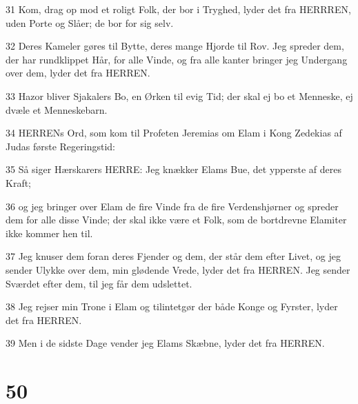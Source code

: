 \par 31 Kom, drag op mod et roligt Folk, der bor i Tryghed, lyder det fra HERRREN, uden Porte og Slåer; de bor for sig selv.
\par 32 Deres Kameler gøres til Bytte, deres mange Hjorde til Rov. Jeg spreder dem, der har rundklippet Hår, for alle Vinde, og fra alle kanter bringer jeg Undergang over dem, lyder det fra HERREN.
\par 33 Hazor bliver Sjakalers Bo, en Ørken til evig Tid; der skal ej bo et Menneske, ej dvæle et Menneskebarn.
\par 34 HERRENs Ord, som kom til Profeten Jeremias om Elam i Kong Zedekias af Judas første Regeringstid:
\par 35 Så siger Hærskarers HERRE: Jeg knækker Elams Bue, det ypperste af deres Kraft;
\par 36 og jeg bringer over Elam de fire Vinde fra de fire Verdenshjørner og spreder dem for alle disse Vinde; der skal ikke være et Folk, som de bortdrevne Elamiter ikke kommer hen til.
\par 37 Jeg knuser dem foran deres Fjender og dem, der står dem efter Livet, og jeg sender Ulykke over dem, min glødende Vrede, lyder det fra HERREN. Jeg sender Sværdet efter dem, til jeg får dem udslettet.
\par 38 Jeg rejser min Trone i Elam og tilintetgør der både Konge og Fyrster, lyder det fra HERREN.
\par 39 Men i de sidste Dage vender jeg Elams Skæbne, lyder det fra HERREN.

\chapter{50}


